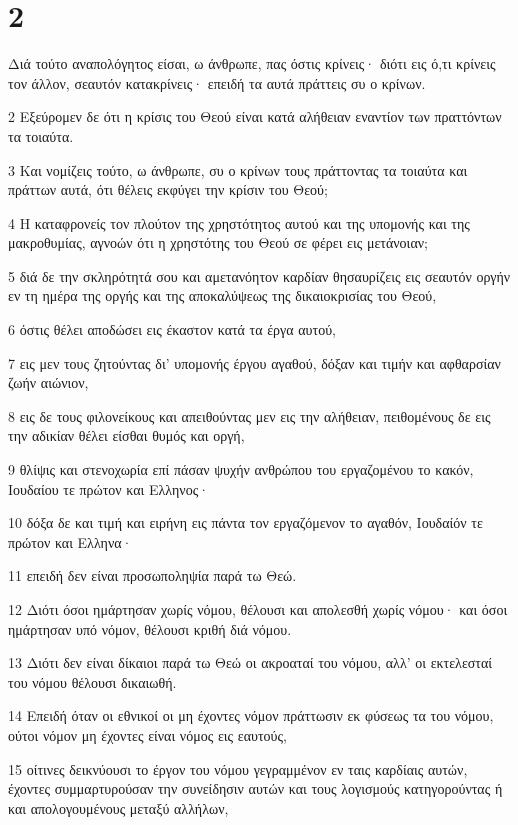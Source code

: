 \chapter{2}

\par Διά τούτο αναπολόγητος είσαι, ω άνθρωπε, πας όστις κρίνεις· διότι εις ό,τι κρίνεις τον άλλον, σεαυτόν κατακρίνεις· επειδή τα αυτά πράττεις συ ο κρίνων.
\par 2 Εξεύρομεν δε ότι η κρίσις του Θεού είναι κατά αλήθειαν εναντίον των πραττόντων τα τοιαύτα.
\par 3 Και νομίζεις τούτο, ω άνθρωπε, συ ο κρίνων τους πράττοντας τα τοιαύτα και πράττων αυτά, ότι θέλεις εκφύγει την κρίσιν του Θεού;
\par 4 Η καταφρονείς τον πλούτον της χρηστότητος αυτού και της υπομονής και της μακροθυμίας, αγνοών ότι η χρηστότης του Θεού σε φέρει εις μετάνοιαν;
\par 5 διά δε την σκληρότητά σου και αμετανόητον καρδίαν θησαυρίζεις εις σεαυτόν οργήν εν τη ημέρα της οργής και της αποκαλύψεως της δικαιοκρισίας του Θεού,
\par 6 όστις θέλει αποδώσει εις έκαστον κατά τα έργα αυτού,
\par 7 εις μεν τους ζητούντας δι' υπομονής έργου αγαθού, δόξαν και τιμήν και αφθαρσίαν ζωήν αιώνιον,
\par 8 εις δε τους φιλονείκους και απειθούντας μεν εις την αλήθειαν, πειθομένους δε εις την αδικίαν θέλει είσθαι θυμός και οργή,
\par 9 θλίψις και στενοχωρία επί πάσαν ψυχήν ανθρώπου του εργαζομένου το κακόν, Ιουδαίου τε πρώτον και Ελληνος·
\par 10 δόξα δε και τιμή και ειρήνη εις πάντα τον εργαζόμενον το αγαθόν, Ιουδαίόν τε πρώτον και Ελληνα·
\par 11 επειδή δεν είναι προσωποληψία παρά τω Θεώ.
\par 12 Διότι όσοι ημάρτησαν χωρίς νόμου, θέλουσι και απολεσθή χωρίς νόμου· και όσοι ημάρτησαν υπό νόμον, θέλουσι κριθή διά νόμου.
\par 13 Διότι δεν είναι δίκαιοι παρά τω Θεώ οι ακροαταί του νόμου, αλλ' οι εκτελεσταί του νόμου θέλουσι δικαιωθή.
\par 14 Επειδή όταν οι εθνικοί οι μη έχοντες νόμον πράττωσιν εκ φύσεως τα του νόμου, ούτοι νόμον μη έχοντες είναι νόμος εις εαυτούς,
\par 15 οίτινες δεικνύουσι το έργον του νόμου γεγραμμένον εν ταις καρδίαις αυτών, έχοντες συμμαρτυρούσαν την συνείδησιν αυτών και τους λογισμούς κατηγορούντας ή και απολογουμένους μεταξύ αλλήλων,
